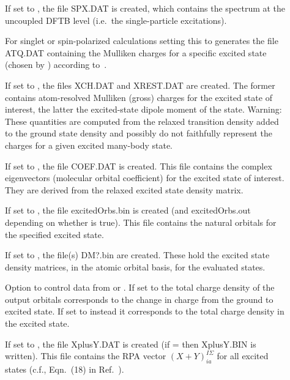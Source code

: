 \begin{description}
  \item[] If set to , the file SPX.DAT is
    created, which contains the spectrum at the uncoupled DFTB level (i.e.\ the
    single-particle excitations).

  \item[] For singlet or spin-polarized
    calculations setting this to  generates the file
    ATQ.DAT containing the Mulliken charges for a specific excited state (chosen by
    ) according to~\cite{plotz2014new}.

  \item[] If set to , the files XCH.DAT and XREST.DAT
    are created. The former contains atom-resolved Mulliken (gross) charges for
    the excited state of interest, the latter the excited-state dipole moment of
    the state. Warning: These quantities are computed from the relaxed
    transition density added to the ground state density and possibly do not
    faithfully represent the charges for a given excited many-body
    state.

  \item[] If set to , the file COEF.DAT is
    created. This file contains the complex eigenvectors (molecular orbital
    coefficient) for the excited state of interest. They are derived from the
    relaxed excited state density matrix.

  \item[] If set to , the file excitedOrbs.bin is
    created (and excitedOrbs.out depending on whether  is
    true). This file contains the natural orbitals for the specified excited
    state.

  \item[] If set to , the file(s) DM?.bin are
    created. These hold the excited state density matrices, in the atomic
    orbital basis, for the evaluated states.

  \item[] Option to control data from
     or . If set to  the
    total charge density of the output orbitals corresponds to the change in
    charge from the ground to excited state. If set to  instead it
    corresponds to the total charge density in the excited state.

  \item[] If set to , the file XplusY.DAT is
    created (if   =  then XplusY.BIN is written).
    This file contains the RPA vector $(X+Y)^{I\Sigma}_{ia}$ for all
    excited states (c.f., Eqn.~(18) in Ref.~\cite{heringer2007aes}).


\end{description}
